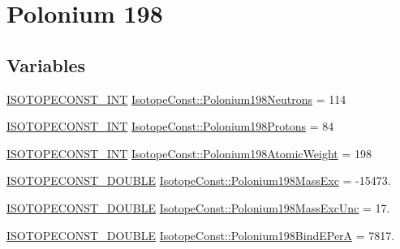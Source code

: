 \hypertarget{group___isotope_const-_polonium-_po198}{}\section{Polonium 198}
\label{group___isotope_const-_polonium-_po198}
\subsection*{Variables}
\begin{DoxyCompactItemize}
\item 
\mbox{\hyperlink{group___isotope_const-_macros_ga5f18360b3e99483a35c32d789e62621c}{I\+S\+O\+T\+O\+P\+E\+C\+O\+N\+S\+T\+\_\+\+I\+NT}} \mbox{\hyperlink{group___isotope_const-_polonium-_po198_gaced5150cb5d410d4a46fba5356b34d54}{Isotope\+Const\+::\+Polonium198\+Neutrons}} = 114
\item 
\mbox{\hyperlink{group___isotope_const-_macros_ga5f18360b3e99483a35c32d789e62621c}{I\+S\+O\+T\+O\+P\+E\+C\+O\+N\+S\+T\+\_\+\+I\+NT}} \mbox{\hyperlink{group___isotope_const-_polonium-_po198_ga08cad3c8a8401ae6e3da30741a8fb74b}{Isotope\+Const\+::\+Polonium198\+Protons}} = 84
\item 
\mbox{\hyperlink{group___isotope_const-_macros_ga5f18360b3e99483a35c32d789e62621c}{I\+S\+O\+T\+O\+P\+E\+C\+O\+N\+S\+T\+\_\+\+I\+NT}} \mbox{\hyperlink{group___isotope_const-_polonium-_po198_ga935d25ee0c109cbb5c79ac6de896eaa2}{Isotope\+Const\+::\+Polonium198\+Atomic\+Weight}} = 198
\item 
\mbox{\hyperlink{group___isotope_const-_macros_ga8f45a7272ce02c0b4c65c44636ed719a}{I\+S\+O\+T\+O\+P\+E\+C\+O\+N\+S\+T\+\_\+\+D\+O\+U\+B\+LE}} \mbox{\hyperlink{group___isotope_const-_polonium-_po198_ga74de6291d99912e5ac2cc4bbbb5c3868}{Isotope\+Const\+::\+Polonium198\+Mass\+Exc}} = -\/15473.
\item 
\mbox{\hyperlink{group___isotope_const-_macros_ga8f45a7272ce02c0b4c65c44636ed719a}{I\+S\+O\+T\+O\+P\+E\+C\+O\+N\+S\+T\+\_\+\+D\+O\+U\+B\+LE}} \mbox{\hyperlink{group___isotope_const-_polonium-_po198_ga528091fc98f227e892e1cff8c9b6c7c0}{Isotope\+Const\+::\+Polonium198\+Mass\+Exc\+Unc}} = 17.
\item 
\mbox{\hyperlink{group___isotope_const-_macros_ga8f45a7272ce02c0b4c65c44636ed719a}{I\+S\+O\+T\+O\+P\+E\+C\+O\+N\+S\+T\+\_\+\+D\+O\+U\+B\+LE}} \mbox{\hyperlink{group___isotope_const-_polonium-_po198_ga3aa0ccdccfd0d351779c22f3c9f16274}{Isotope\+Const\+::\+Polonium198\+Bind\+E\+PerA}} = 7817.
\item 

\end{DoxyCompactItemize}
